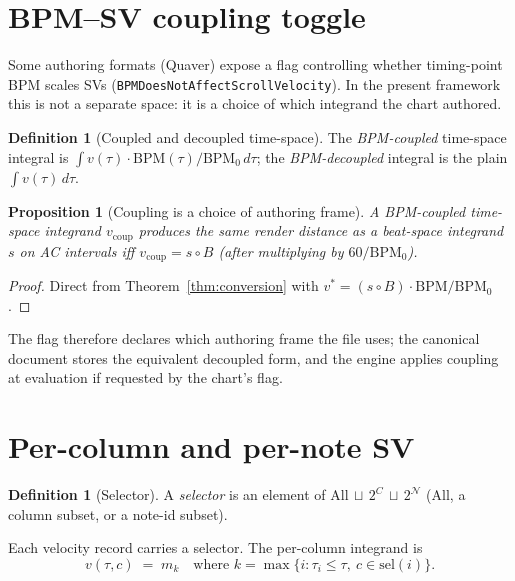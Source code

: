 \documentclass[11pt]{article}
\newtheorem{proposition}[theorem]{Proposition}
\theoremstyle{definition}
\newtheorem{definition}[theorem]{Definition}
\newcommand{\bpmz}{\mathrm{BPM}_0}
\newcommand{\bpm}{\mathrm{BPM}}
\newcommand{\dtau}{\,d\tau}
\begin{document}
\section{BPM--SV coupling toggle}
\label{sec:coupling}

Some authoring formats (Quaver) expose a flag controlling whether timing-point
BPM scales SVs (\texttt{BPMDoesNotAffectScrollVelocity}). In the present
framework this is not a separate space: it is a choice of which integrand
the chart authored.

\begin{definition}[Coupled and decoupled time-space]
The \emph{BPM-coupled} time-space integral is
$\int v(\tau) \cdot \bpm(\tau)/\bpmz \dtau$;
the \emph{BPM-decoupled} integral is the plain $\int v(\tau)\dtau$.
\end{definition}

\begin{proposition}[Coupling is a choice of authoring frame]
\label{prop:coupling}
A BPM-coupled time-space integrand $v_{\mathrm{coup}}$ produces the same
render distance as a beat-space integrand $s$ on AC intervals iff
$v_{\mathrm{coup}} = s \circ B$ (after multiplying by $60/\bpmz$).
\end{proposition}

\begin{proof}
Direct from Theorem~\ref{thm:conversion} with $v^* = (s \circ B) \cdot \bpm/\bpmz$.
\qedhere
\end{proof}

The flag therefore declares which authoring frame the file uses; the canonical
document stores the equivalent decoupled form, and the engine applies coupling
at evaluation if requested by the chart's flag.

\section{Per-column and per-note SV}
\label{sec:per-column}

\begin{definition}[Selector]
A \emph{selector} is an element of
$\mathrm{All} \,\sqcup\, 2^C \,\sqcup\, 2^{\mathcal{N}}$
($\mathrm{All}$, a column subset, or a note-id subset).
\end{definition}

Each velocity record carries a selector. The per-column integrand is
\[
v(\tau, c) \;=\; m_k \quad \text{where } k = \max\{ i : \tau_i \leq \tau,\ c \in \mathrm{sel}(i)\}.
\]
\end{document}
